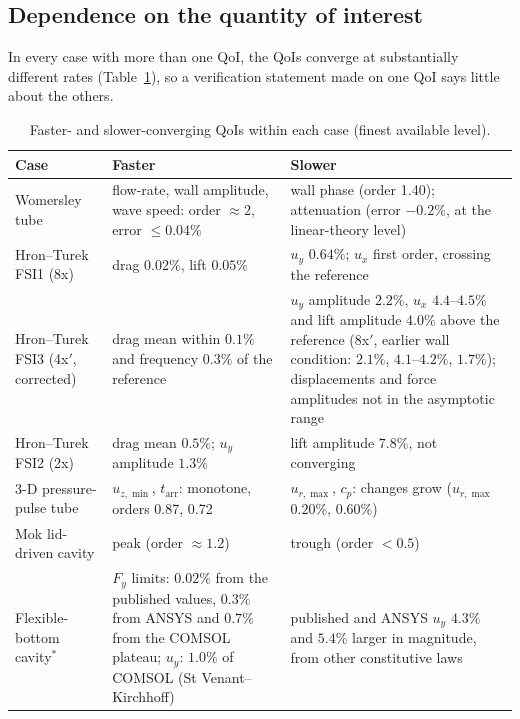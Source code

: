 \subsection{Dependence on the quantity of interest}\label{sec:qoi_dependence}

In every case with more than one QoI, the QoIs converge at substantially different rates (Table~\ref{tab:qoi_dependence}), so a verification statement made on one QoI says little about the others.

\begin{table}[htbp]
	\centering
	\footnotesize
	\setlength{\tabcolsep}{3pt}
	\caption{Faster- and slower-converging QoIs within each case (finest available level).}
	\label{tab:qoi_dependence}
	\begin{tabular}{p{2.8cm}p{5.4cm}p{5.4cm}}
		\toprule
		Case & Faster & Slower \\
		\midrule
		Womersley tube & flow-rate, wall amplitude, wave speed: order $\approx2$, error $\leq0.04\%$ & wall phase (order 1.40); attenuation (error $-0.2\%$, at the linear-theory level) \\
		Hron--Turek FSI1 (8x) & drag $0.02\%$, lift $0.05\%$ & $u_y$ $0.64\%$; $u_x$ first order, crossing the reference \\
		Hron--Turek FSI3 (4x$'$, corrected) & drag mean within $0.1\%$ and frequency $0.3\%$ of the reference & $u_y$ amplitude $2.2\%$, $u_x$ $4.4$--$4.5\%$ and lift amplitude $4.0\%$ above the reference (8x$'$, earlier wall condition: $2.1\%$, $4.1$--$4.2\%$, $1.7\%$); displacements and force amplitudes not in the asymptotic range \\
		Hron--Turek FSI2 (2x) & drag mean $0.5\%$; $u_y$ amplitude $1.3\%$ & lift amplitude $7.8\%$, not converging \\
		3-D pressure-pulse tube & $u_{z,\min}$, $t_\mathrm{arr}$: monotone, orders 0.87, 0.72 & $u_{r,\max}$, $c_p$: changes grow ($u_{r,\max}$ $0.20\%$, $0.60\%$) \\
		Mok lid-driven cavity & peak (order $\approx1.2$) & trough (order $<0.5$) \\
		Flexible-bottom cavity$^\ast$ & $F_y$ limits: $0.02\%$ from the published values, $0.3\%$ from ANSYS and $0.7\%$ from the COMSOL plateau; $u_y$: $1.0\%$ of COMSOL (St Venant--Kirchhoff) & published and ANSYS $u_y$ $4.3\%$ and $5.4\%$ larger in magnitude, from other constitutive laws \\
				\bottomrule
	\end{tabular}
\end{table}


